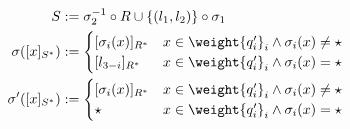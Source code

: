 \begin{definition}
\begin{itemize}
\begin{mathpar}
		\end{mathpar}
	\begin{align*}
		S &:= \sigma_2^{-1} \circ R \cup \{(l_1,l_2)\} \circ \sigma_1 \\
		\sigma([x]_{S^*}) &:= 
		\begin{cases}
			[\sigma_i(x)]_{R^*} & x \in \weight{q'_i}_i \land \sigma_i(x) \neq \star \\
			[l_{3-i}]_{R^*} & x \in \weight{q'_i}_i \land \sigma_i(x) = \star 
		\end{cases}
		\\
		\sigma'([x]_{S^*}) &:= 
		\begin{cases}
			[\sigma_i(x)]_{R^*} & x \in \weight{q'_i}_i \land \sigma_i(x) \neq \star \\
			\star & x \in \weight{q'_i}_i \land \sigma_i(x) = \star 
		\end{cases}
	\end{align*}

\end{itemize}
\end{definition}
